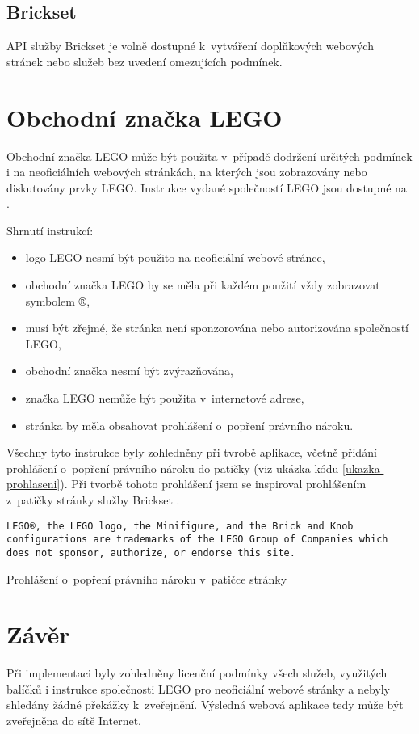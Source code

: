 \subsection{Brickset}
API služby Brickset je volně dostupné k~vytváření doplňkových webových stránek nebo služeb bez uvedení omezujících podmínek. \autocite{brickset:key} 

\section{Obchodní značka LEGO}
Obchodní značka LEGO může být použita v~případě dodržení určitých podmínek i na neoficiálních webových stránkách, na kterých jsou zobrazovány nebo diskutovány prvky LEGO. Instrukce vydané společností LEGO jsou dostupné na \autocite{lego:fair-play}.

Shrnutí instrukcí: 
\begin{itemize}
        \item logo LEGO nesmí být použito na neoficiální webové stránce,
        \item obchodní značka LEGO by se měla při každém použití vždy zobrazovat symbolem ®,
        \item musí být zřejmé, že stránka není sponzorována nebo autorizována společností LEGO,
        \item obchodní značka nesmí být zvýrazňována,
        \item značka LEGO nemůže být použita v~internetové adrese,
        \item stránka by měla obsahovat prohlášení o~popření právního nároku.
\end{itemize}

Všechny tyto instrukce byly zohledněny při tvrobě aplikace, včetně přidání prohlášení o~popření právního nároku do patičky (viz ukázka kódu \ref{ukazka-prohlaseni}). Při tvorbě tohoto prohlášení jsem se inspiroval prohlášením z~patičky stránky služby Brickset \autocite{brickset:about}.

\begin{listing}[htbp]
        \begin{verbatim}
LEGO®, the LEGO logo, the Minifigure, and the Brick and Knob 
configurations are trademarks of the LEGO Group of Companies which
does not sponsor, authorize, or endorse this site.
        \end{verbatim}
    \caption{Prohlášení o~popření právního nároku v~patičce stránky\label{ukazka-prohlaseni}}
\end{listing}

\section{Závěr}
Při implementaci byly zohledněny licenční podmínky všech služeb, využitých balíčků i instrukce společnosti LEGO pro neoficiální webové stránky a nebyly shledány žádné překážky k~zveřejnění. Výsledná webová aplikace tedy může být zveřejněna do sítě Internet.